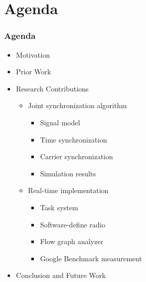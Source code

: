 \section{Agenda}

\begin{frame}
  \frametitle{Agenda}
    \begin{itemize}
        \item{Motivation}
        \item{Prior Work}
        \item{Research Contributions} 
        \begin{itemize}
            \item Joint synchronization algorithm
                \begin{itemize}
                \item Signal model
                \item Time synchronization
                \item Carrier synchronization
                \item Simulation results
                \end{itemize}
            \item Real-time implementation
                \begin{itemize}
                \item Task system
                \item Software-define radio
                \item Flow graph analyzer
                \item Google Benchmark measurement
                \end{itemize}
        \end{itemize}
        \item{Conclusion and Future Work}
    \end{itemize}
\end{frame}
